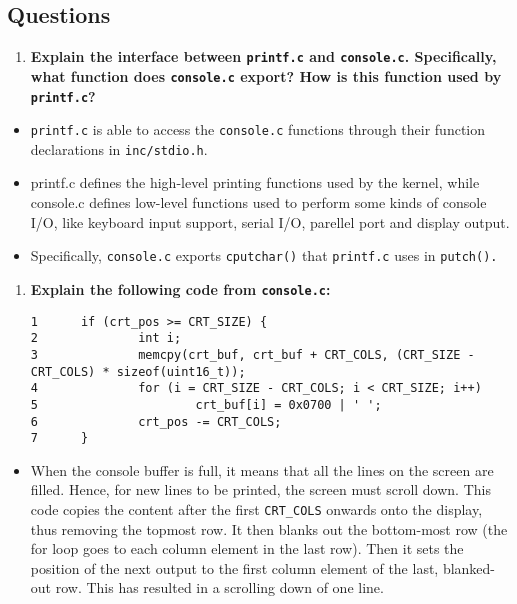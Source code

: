 \documentclass[]{article}
\begin{document}
\subsection{Questions}

\begin{enumerate}
\def\labelenumi{\arabic{enumi}.}
\itemsep1pt\parskip0pt
\item
  \textbf{Explain the interface between \texttt{printf.c} and
  \texttt{console.c}. Specifically, what function does
  \texttt{console.c} export? How is this function used by
  \texttt{printf.c}?}
\end{enumerate}

\begin{itemize}
\itemsep1pt\parskip0pt
\item
  \texttt{printf.c} is able to access the \texttt{console.c} functions
  through their function declarations in \texttt{inc/stdio.h}.
\item
  printf.c defines the high-level printing functions used by the kernel,
  while console.c defines low-level functions used to perform some kinds
  of console I/O, like keyboard input support, serial I/O, parellel port
  and display output.
\item
  Specifically, \texttt{console.c} exports \texttt{cputchar()} that
  \texttt{printf.c} uses in \texttt{putch().}
\end{itemize}

\begin{enumerate}
\def\labelenumi{\arabic{enumi}.}
\setcounter{enumi}{1}
\item
  \textbf{Explain the following code from \texttt{console.c}:}

\begin{verbatim}
1      if (crt_pos >= CRT_SIZE) {
2              int i;
3              memcpy(crt_buf, crt_buf + CRT_COLS, (CRT_SIZE - CRT_COLS) * sizeof(uint16_t));
4              for (i = CRT_SIZE - CRT_COLS; i < CRT_SIZE; i++)
5                      crt_buf[i] = 0x0700 | ' ';
6              crt_pos -= CRT_COLS;
7      }
\end{verbatim}
\end{enumerate}

\begin{itemize}
\itemsep1pt\parskip0pt
\item
  When the console buffer is full, it means that all the lines on the
  screen are filled. Hence, for new lines to be printed, the screen must
  scroll down. This code copies the content after the first
  \texttt{CRT\_COLS} onwards onto the display, thus removing the topmost
  row. It then blanks out the bottom-most row (the for loop goes to each
  column element in the last row). Then it sets the position of the next
  output to the first column element of the last, blanked-out row. This
  has resulted in a scrolling down of one line.
\end{itemize}
\end{document}
